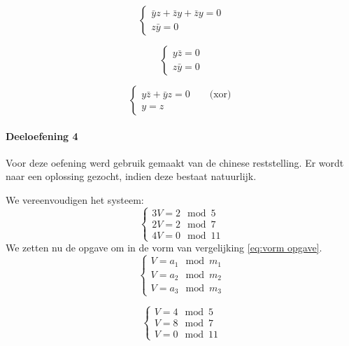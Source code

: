 \documentclass[12pt]{article}
\newcommand{\ov}[1]{\bar{#1}}
\begin{document}
    \begin{equation}
    	\begin{cases}
    		\ov{y}z + \ov{z}y + \ov{z}y = 0 \\
    		z\ov{y} = 0
    	\end{cases}
    \end{equation}

    \begin{equation}
    	\begin{cases}
    		y\ov{z} = 0 \\
    		z\ov{y} = 0
    	\end{cases}
    \end{equation}

	\begin{equation}
    	\begin{cases}
    		y\ov{z} + \ov{y}z = 0 \qquad \text{(xor)} \\
    		y = z
    	\end{cases}
    \end{equation}    

	\paragraph{Deeloefening 4}
	
    Voor deze oefening werd gebruik gemaakt van de chinese reststelling. Er wordt naar een oplossing gezocht, indien deze bestaat natuurlijk.
    
    We vereenvoudigen het systeem:
	\begin{equation}
        \begin{cases}
            3V = 2 \mod 5 \\
            2V = 2 \mod 7 \\
            4V = 0 \mod 11
        \end{cases}
    \end{equation}
    We zetten nu de opgave om in de vorm van vergelijking \ref{eq:vorm opgave}.
    \begin{equation} \label{eq:vorm opgave}
        \begin{cases}
            V = a_1 \mod m_1 \\
            V = a_2 \mod m_2 \\
            V = a_3 \mod m_3
        \end{cases}
    \end{equation}
    
    \begin{equation}
        \begin{cases}
            V = 4 \mod 5 \\
            V = 8 \mod 7 \\
            V = 0 \mod 11
        \end{cases}
    \end{equation}
    
\end{document}
